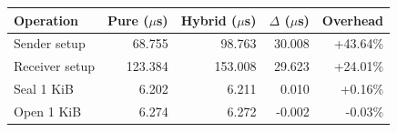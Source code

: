 \begin{tabular}{lrrrr}
\toprule
Operation & Pure ($\mu$s) & Hybrid ($\mu$s) & $\Delta$ ($\mu$s) & Overhead \\
\midrule
Sender setup & 68.755 & 98.763 & 30.008 & +43.64\% \\
Receiver setup & 123.384 & 153.008 & 29.623 & +24.01\% \\
Seal 1 KiB & 6.202 & 6.211 & 0.010 & +0.16\% \\
Open 1 KiB & 6.274 & 6.272 & -0.002 & -0.03\% \\
\bottomrule
\end{tabular}
